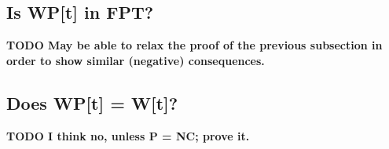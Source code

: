 \documentclass{article}
\newcommand{\todo}[1]{\textbf{TODO #1}}
\begin{document}
\subsection{Is WP[t] in FPT?}

\todo{May be able to relax the proof of the previous subsection in order to show similar (negative) consequences.}

\subsection{Does WP[t] = W[t]?}

\todo{I think no, unless P = NC; prove it.}

\printbibliography
\end{document}
